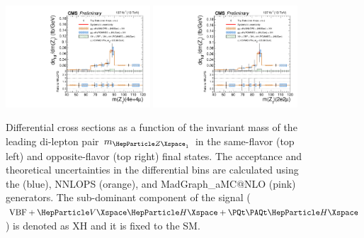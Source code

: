 


\begin{center}
	\begin{figure}[!htb]
		\centering
		\includegraphics[width=0.48\textwidth]{Images/H4L/ZCands/model_v4/massZ1_unfoldwith_4l_SM_125_asimov.pdf}
		\includegraphics[width=0.48\textwidth]{Images/H4L/ZCands/model_v4/massZ1_unfoldwith_2e2mu_SM_125_asimov.pdf}\\
		\caption{
			Differential cross sections as a function of the invariant mass of the leading di-lepton pair $m_{\PZ_{1}}$ in the same-flavor (top left) and opposite-flavor (top right)  final states.
			The acceptance and theoretical uncertainties in the differential bins are calculated using the \POWHEG (blue), NNLOPS (orange), and MadGraph\_aMC@NLO (pink) generators.
			The sub-dominant component of the signal ($\VBF + \VH + \ttH$) is denoted as XH and it is fixed to the SM.
			\label{fig:fidMZ1}}
	\end{figure}
\end{center}

